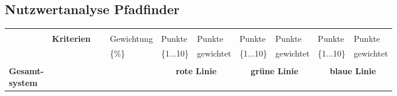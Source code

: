 \documentclass[main.tex]{subfiles} %
\begin{document}
\begin{landscape} %
    \thispagestyle{fancy}

    \subsection{Nutzwertanalyse Pfadfinder}

    \begin{table}[ht]
        \centering
        \begin{tabular}{|p{0.11\linewidth}|p{0.18\linewidth}|p{0.085\linewidth}|p{0.057\linewidth}|p{0.07\linewidth}|p{0.057\linewidth}|p{0.07\linewidth}|p{0.057\linewidth}|p{0.07\linewidth}|}
            \hline
                                                      &                                     &                                            &                                           &                                            &            &             &            &             \\[-9pt]
                                                      & \multirow{2}{*}{\textbf{Kriterien}} & Gewichtung                                 & Punkte                                    & Punkte                                     & Punkte     & Punkte      & Punkte     & Punkte      \\[1pt]
                                                      &                                     & \{\%\}                                     & \{1...10\}                                & gewichtet                                  & \{1...10\} & gewichtet   & \{1...10\} & gewichtet   \\[1pt]
            \hline
            \hline
                                                      & \multicolumn{2}{c|}{}               & \multicolumn{2}{c|}{}                      & \multicolumn{2}{c|}{}                     & \multicolumn{2}{c|}{}                                                                            \\[-9pt]
            \multirow{7}{4em}{\textbf{Gesamt-system}} & \multicolumn{2}{c|}{}               & \multicolumn{2}{c|}{\textbf{rote Linie}}   & \multicolumn{2}{c|}{\textbf{grüne Linie}} & \multicolumn{2}{c|}{\textbf{blaue Linie}}                                                        \\[1pt]
            \cline{2-9}
                                                      &                                     &                                            &                                           &                                            &            &             &            &             \\[-9pt]

\end{tabular}
\end{table}
\end{landscape}
\end{document}
